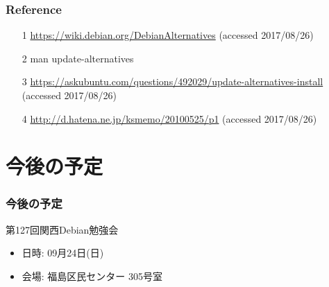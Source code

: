 \documentclass[cjk,dvipdfmx,12pt,compress,%
hyperref={bookmarks=true,bookmarksnumbered=true,bookmarksopen=false,%
colorlinks=false,%
pdftitle={第 120 回 関西 Debian 勉強会},%
pdfauthor={倉敷・のがた・佐々木・かわだ・おおつき},%
pdfsubject={資料},%
}]{beamer}
\begin{document}
\begin{frame}[fragile]
  \frametitle{Reference}
   \begin{itemize}
     \item [1] \url{https://wiki.debian.org/DebianAlternatives} (accessed 2017/08/26) \\
     \item [2] man update-alternatives \\
     \item [3] \url{https://askubuntu.com/questions/492029/update-alternatives-install} (accessed 2017/08/26) \\
     \item [4] \url{http://d.hatena.ne.jp/ksmemo/20100525/p1} (accessed 2017/08/26)
   \end{itemize}
\end{frame}



\section{今後の予定}
\begin{frame}[fragile]
  \frametitle{今後の予定}
  \begin{block}{第127回関西Debian勉強会}
    \begin{itemize}
    \item 日時: 09月24日(日)
    \item 会場: 福島区民センター  305号室
    \end{itemize}
  \end{block}
\end{frame}

\takahashi[50]{  }
\end{document}
